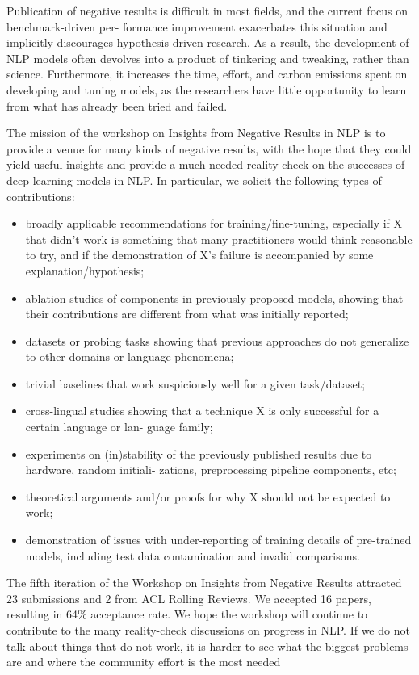 
Publication of negative results is difficult in most fields, and the current focus on benchmark-driven per-
formance improvement exacerbates this situation and implicitly discourages hypothesis-driven research.
As a result, the development of NLP models often devolves into a product of tinkering and tweaking,
rather than science. Furthermore, it increases the time, effort, and carbon emissions spent on developing
and tuning models, as the researchers have little opportunity to learn from what has already been tried
and failed.

The mission of the workshop on Insights from Negative Results in NLP is to provide a venue for many
kinds of negative results, with the hope that they could yield useful insights and provide a much-needed
reality check on the successes of deep learning models in NLP. In particular, we solicit the following
types of contributions:
\begin{itemize}
    \item broadly applicable recommendations for training/fine-tuning, especially if X that didn’t work is
something that many practitioners would think reasonable to try, and if the demonstration of X’s
failure is accompanied by some explanation/hypothesis;
\item  ablation studies of components in previously proposed models, showing that their contributions
are different from what was initially reported;
\item  datasets or probing tasks showing that previous approaches do not generalize to other domains or
language phenomena;
\item  trivial baselines that work suspiciously well for a given task/dataset;
\item  cross-lingual studies showing that a technique X is only successful for a certain language or lan-
guage family;
\item  experiments on (in)stability of the previously published results due to hardware, random initiali-
zations, preprocessing pipeline components, etc;
\item  theoretical arguments and/or proofs for why X should not be expected to work;
\item  demonstration of issues with under-reporting of training details of pre-trained models, including
test data contamination and invalid comparisons.

\end{itemize}

The fifth iteration of the Workshop on Insights from Negative Results attracted 23 submissions and 2 from
ACL Rolling Reviews.
We accepted 16 papers, resulting in  64\% acceptance rate.
We hope the workshop will continue to contribute to the many reality-check discussions on progress in
NLP. If we do not talk about things that do not work, it is harder to see what the biggest problems are
and where the community effort is the most needed
